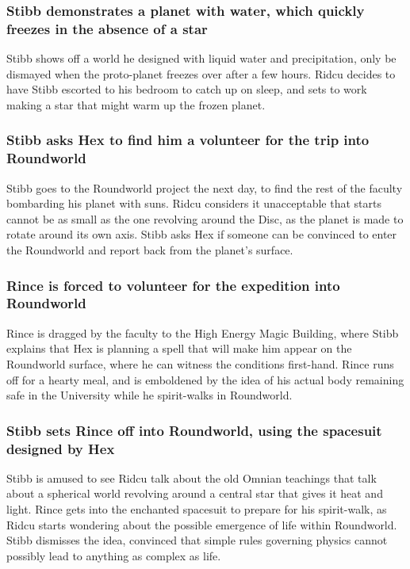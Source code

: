 \subsubsection{\Gls{Stibb} demonstrates a planet with water, which quickly freezes in the absence
    of a star}
\Gls{Stibb} shows off a world he designed with liquid water and precipitation, only be dismayed when
the proto-planet freezes over after a few hours. \Gls{Ridcu} decides to have \Gls{Stibb} escorted
to his bedroom to catch up on sleep, and sets to work making a star that might warm up the frozen
planet.

\subsubsection{\Gls{Stibb} asks \Gls{Hex} to find him a volunteer for the trip into Roundworld}
\Gls{Stibb} goes to the Roundworld project the next day, to find the rest of the faculty bombarding
his planet with suns. \Gls{Ridcu} considers it unacceptable that starts cannot be as small as the
one revolving around the Disc, as the planet is made to rotate around its own axis. \Gls{Stibb} asks
\Gls{Hex} if someone can be convinced to enter the Roundworld and report back from the planet's
surface.

\subsubsection{\Gls{Rince} is forced to volunteer for the expedition into Roundworld}
\Gls{Rince} is dragged by the faculty to the High Energy Magic Building, where \Gls{Stibb} explains
that \Gls{Hex} is planning a spell that will make him appear on the Roundworld surface, where he
can witness the conditions first-hand. \Gls{Rince} runs off for a hearty meal, and is emboldened
by the idea of his actual body remaining safe in the University while he spirit-walks in Roundworld.

\subsubsection{\Gls{Stibb} sets \Gls{Rince} off into Roundworld, using the spacesuit designed by
    \Gls{Hex}}
\Gls{Stibb} is amused to see \Gls{Ridcu} talk about the old Omnian teachings that talk about a
spherical world revolving around a central star that gives it heat and light. \Gls{Rince} gets into
the enchanted spacesuit to prepare for his spirit-walk, as \Gls{Ridcu} starts wondering about the
possible emergence of life within Roundworld. \Gls{Stibb} dismisses the idea, convinced that simple
rules governing physics cannot possibly lead to anything as complex as life.

